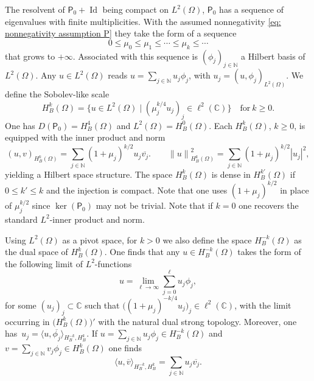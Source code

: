 \documentclass[10pt]{amsart}
\let\sep\mid
\theoremstyle{plain}
\theoremstyle{definition}
\def\C{\mathbb{C}}
\def\N{\mathbb{N}}
\newcommand{\ovl}[1]{\overline{#1}}
\newcommand{\inp}[2]{(#1, #2)}
\newcommand{\dup}[2]{\langle #1 , #2 \rangle}
\newcommand{\Norm}[2]{{\| #1 \|}_{#2}}
\newcommand{\Pell}{\mathsf P_0}
\DeclareMathOperator{\id}{Id}
\begin{document}
The resolvent of $\Pell +\id$ being compact on $L^2(\Omega)$, $\Pell$ has a sequence of
eigenvalues with finite multiplicities. With the assumed nonnegativity
\eqref{eq: nonnegativity assumption P} they take the form of a sequence
\begin{equation*}
0\leq \mu_0 \leq \mu_1 \leq \cdots \leq \mu_k \leq \cdots
\end{equation*}
that grows to $+\infty$. Associated with this sequence is
$(\phi_j)_{j \in \N}$ a Hilbert basis of $L^2(\Omega)$.
Any $u \in L^2(\Omega)$ reads $u = \sum_{j \in \N} u_j \phi_j$, with
$u_j = \inp{u}{\phi_j}_{L^2(\Omega)}$.
We define the Sobolev-like scale
\begin{equation}
\label{eq: Sobolev scale}
H^k_B (\Omega)= \{ u \in L^2(\Omega)\sep (\mu_j^{k/4} u_j)_j \in \ell^2(\C)\}
\quad \text{for} \ k\geq 0.
\end{equation}
One has $D(\Pell) = H^4_B (\Omega)$ and $L^2(\Omega) = H^0_B(\Omega)$. Each $H^k_B (\Omega)$, $k \geq 0$, is equipped with
the inner product and norm
\begin{equation*}
\inp{u}{ v}_{H^k_B (\Omega)}
= \sum_{j \in \N} (1 + \mu_j)^{k/2} u_j \ovl{v_j}.
\qquad \Norm{u}{H^k_B (\Omega)}^2 = \sum_{j \in \N} (1 + \mu_j)^{k/2} |u_j|^2,
\end{equation*}
yielding a Hilbert space structure.
The space $H^k_B (\Omega)$ is dense in $H^{k'}_B (\Omega)$ if $0\leq
k' \leq k$ and the injection is compact.
Note that one uses $(1 + \mu_j)^{k/2}$ in place of $\mu_j^{k/2}$ since
$\ker(\Pell)$ may not be trivial. Note that if $k=0$ one recovers the
standard $L^2$-inner product and norm.

Using $L^2(\Omega)$ as a pivot space, for $k >0$ we also define the space
$H^{-k}_B(\Omega)$ as the dual space of $H^k_B(\Omega)$. One
finds that any $u \in H^{-k}_B(\Omega)$ takes the form of the
following limit of $L^2$-functions
\begin{equation*}
u = \lim_{\ell \to \infty} \sum_{j=0}^\ell u_j \phi_j,
\end{equation*}
for some $(u_j)_j \!\subset\! \C$ such that $\big((1 + \mu_j)^{-k/4} u_j\big)_j \!\in\!\ell^2(\C)$, with the limit \hbox{occurring} in
$\big(H^k_B(\Omega)\big)'$ with the natural dual strong topology. Moreover, one has~\hbox{$u_j \!=\!\dup{u}{\ovl{\phi_j}}\!_{H^{-k}_B, H^{k}_B}$}.
If $u = \sum_{j \in \N} u_j \phi_j \in H^{-k}_B(\Omega)$ and $v =
\sum_{j \in \N} v_j \phi_j \in H^{k}_B(\Omega)$ one finds
\begin{equation*}
\dup{u}{\ovl{v}}_{H^{-k}_B, H^{k}_B} = \sum_{j \in \N} u_j \ovl{v_j}.
\end{equation*}
\end{document}
